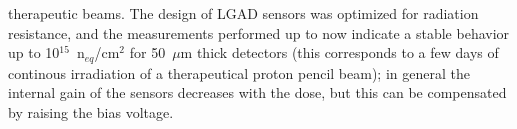 therapeutic beams. The design of LGAD sensors was optimized for radiation
resistance, and the measurements performed up to now indicate a stable behavior up to 10$^{15}$~n$_{eq}$/cm$^2$ for 50~$\mu$m thick detectors
(this corresponds to a few days of continous irradiation of a therapeutical proton pencil beam);
in general the internal gain
of the sensors decreases with the dose, but this can be compensated by raising the bias voltage.



